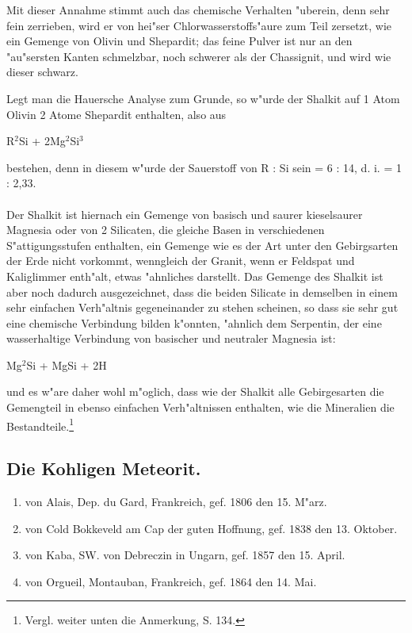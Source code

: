 \documentclass[a4paper, 11pt, oneside]{article}
\begin{document}
Mit dieser Annahme stimmt auch das chemische Verhalten "uberein, denn sehr fein zerrieben, wird er von hei"ser Chlorwasserstoffs"aure zum Teil zersetzt, wie ein Gemenge von Olivin und Shepardit; das feine Pulver ist nur an den "au"sersten Kanten schmelzbar, noch schwerer als der Chassignit, und wird wie dieser schwarz.

Legt man die Hauersche Analyse zum Grunde, so w"urde der Shalkit auf 1 Atom Olivin 2 Atome Shepardit enthalten, also aus
\begin{center}
R$^{2}$Si + 2Mg$^{2}$Si$^{3}$
\end{center}
bestehen, denn in diesem w"urde der Sauerstoff von R : Si sein = 6 : 14, d. i. = 1 : 2,33.
\paragraph{}
Der Shalkit ist hiernach ein Gemenge von basisch und saurer kieselsaurer Magnesia oder von 2 Silicaten, die gleiche Basen in verschiedenen S"attigungsstufen enthalten, ein Gemenge wie es der Art unter den Gebirgsarten der Erde nicht vorkommt, wenngleich der Granit, wenn er Feldspat und Kaliglimmer enth"alt, etwas "ahnliches darstellt. Das Gemenge des Shalkit ist aber noch dadurch ausgezeichnet, dass die beiden Silicate in demselben in einem sehr einfachen Verh"altnis gegeneinander zu stehen scheinen, so dass sie sehr gut eine chemische Verbindung bilden k"onnten, "ahnlich dem Serpentin, der eine wasserhaltige Verbindung von basischer und neutraler Magnesia ist:
\begin{center}
Mg$^{2}$Si + MgSi + 2H
\end{center}
und es w"are daher wohl m"oglich, dass wie der Shalkit alle Gebirgesarten die Gemengteil in ebenso einfachen Verh"altnissen enthalten, wie die Mineralien die Bestandteile.\footnote{Vergl. weiter unten die Anmerkung, S. 134.}
\subsection{Die Kohligen Meteorit.}
\begin{enumerate}
    \item von Alais, Dep. du Gard, Frankreich, gef. 1806 den 15. M"arz.
    \item von Cold Bokkeveld am Cap der guten Hoffnung, gef. 1838 den 13. Oktober.
    \item von Kaba, SW. von Debreczin in Ungarn, gef. 1857 den 15. April.
    \item von Orgueil, Montauban, Frankreich, gef. 1864 den 14. Mai.
\end{enumerate}
\end{document}
